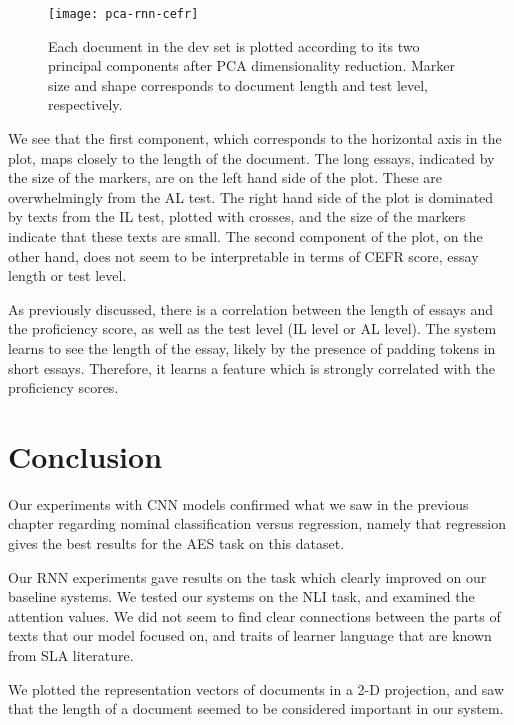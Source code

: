 \begin{figure}
  \centering
  \texttt{[image: pca-rnn-cefr]}
  \caption[PCA plot of the vector representations of documents]{
    Each document in the dev set is plotted according to its two principal
    components after PCA dimensionality reduction. Marker size and shape
    corresponds to document length and test level, respectively.
  }
  \label{fig:pca-rnn-cefr}
\end{figure}

We see that the first component, which corresponds to the horizontal axis in
the plot, maps closely to the length of the document. The long essays,
indicated by the size of the markers, are on the left hand side of the plot.
These are overwhelmingly from the AL test. The right hand side of the plot is
dominated by texts from the IL test, plotted with crosses, and the size of
the markers indicate that these texts are small. The second component of the
plot, on the other hand, does not seem to be interpretable in terms of CEFR
score, essay length or test level.

As previously discussed, there is a correlation between the length of essays
and the proficiency score, as well as the test level (IL level or AL level).
The system learns to see the length of the essay, likely by the presence of
padding tokens in short essays. Therefore, it learns a feature which is
strongly correlated with the proficiency scores.


\section{Conclusion}

Our experiments with \ac{CNN} models confirmed what we saw in the previous
chapter regarding nominal classification versus regression, namely that
regression gives the best results for the \ac{AES} task on this dataset.

Our \ac{RNN} experiments gave results on the task which clearly improved on
our baseline systems. We tested our systems on the NLI task, and examined the
attention values. We did not seem to find clear connections between the parts
of texts that our model focused on, and traits of learner language that are
known from \ac{SLA} literature.

We plotted the representation vectors of documents in a 2-D projection, and
saw that the length of a document seemed to be considered important in our
system.
